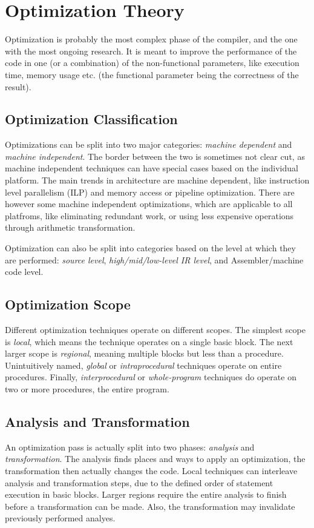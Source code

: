 \documentclass{article}
\begin{document}
\section{Optimization Theory}
Optimization is probably the most complex phase of the compiler, and the one with the most ongoing research.
It is meant to improve the performance of the code in one (or a combination) of the non-functional parameters, like execution time, memory usage etc. (the functional parameter being the correctness of the result).

\subsection{Optimization Classification}
Optimizations can be split into two major categories: \emph{machine dependent} and \emph{machine independent}.
The border between the two is sometimes not clear cut, as machine independent techniques can have special cases based on the individual platform.
The main trends in architecture are machine dependent, like instruction level parallelism (ILP) and memory access or pipeline optimization.
There are however some machine independent optimizations, which are applicable to all platfroms, like eliminating redundant work, or using less expensive operations through arithmetic transformation.

Optimization can also be split into categories based on the level at which they are performed: \emph{source level}, \emph{high/mid/low-level IR level}, and Assembler/machine code level.

\subsection{Optimization Scope}
Different optimization techniques operate on different scopes.
The simplest scope is \emph{local}, which means the technique operates on a single basic block.
The next larger scope is \emph{regional}, meaning multiple blocks but less than a procedure.
Unintuitively named, \emph{global} or \emph{intraprocedural} techniques operate on entire procedures.
Finally, \emph{interprocedural} or \emph{whole-program} techniques do operate on two or more procedures, the entire program.

\subsection{Analysis and Transformation}
An optimization pass is actually split into two phases: \emph{analysis} and \emph{transformation}.
The analysis finds places and ways to apply an optimization, the transformation then actually changes the code.
Local techniques can interleave analysis and transformation steps, due to the defined order of statement execution in basic blocks.
Larger regions require the entire analysis to finish before a transformation can be made.
Also, the transformation may invalidate previously performed analyes.
\end{document}
